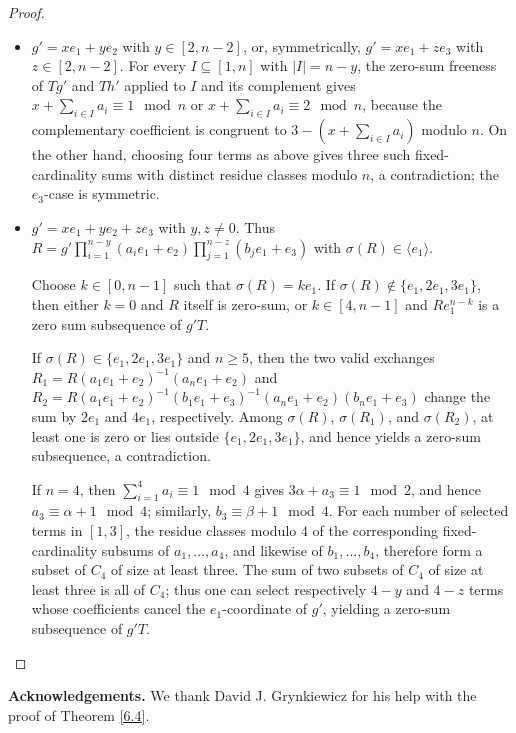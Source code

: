 \documentclass[a4paper, 10pt]{amsart}
\theoremstyle{plain}
\theoremstyle{definition}
\numberwithin{equation}{section}
\begin{document}
{\begin{proof}
\begin{itemize}
		\item[(iii)] $g'=xe_1+ye_2$ with $y\in[2,n-2]$, or, symmetrically, $g'=xe_1+ze_3$ with $z\in[2,n-2]$. 
		For every $I\subseteq[1,n]$ with $|I|=n-y$, the zero-sum freeness of $Tg'$ and $Th'$ applied to $I$ and its complement gives $x+\sum_{i\in I}a_i\equiv1\mod n$ or $x+\sum_{i\in I}a_i\equiv2\mod n$, because the complementary coefficient is congruent to $3-(x+\sum_{i\in I}a_i)$ modulo $n$. On the other hand, choosing four terms as above gives three such fixed-cardinality sums with distinct residue classes modulo $n$, a contradiction; the $e_3$-case is symmetric.
	
		\item[(iv)] $g'=xe_1+ye_2+ze_3$ with $y,z\ne 0$. Thus $R=g'\prod_{i=1}^{n-y} (a_ie_1+e_2)\prod_{j=1}^{n-z}(b_je_1+e_3)$ with $\sigma(R) \in \langle e_1 \rangle$. 
		
Choose $k\in[0,n-1]$ such that $\sigma(R)=ke_1$. If $\sigma(R)\notin \{e_1,2e_1,3e_1\}$, then either $k=0$ and $R$ itself is zero-sum, or $k\in[4,n-1]$ and $Re_1^{n-k}$ is a zero sum subsequence of $g'T$.
		
		If $\sigma(R)\in\{e_1,2e_1,3e_1\}$ and $n\ge5$, then the two valid exchanges $R_1=R(a_1e_1+e_2)^{-1}(a_ne_1+e_2)$ and $R_2=R(a_1e_1+e_2)^{-1}(b_1e_1+e_3)^{-1}(a_ne_1+e_2)(b_ne_1+e_3)$ change the sum by $2e_1$ and $4e_1$, respectively. Among $\sigma(R)$, $\sigma(R_1)$, and $\sigma(R_2)$, at least one is zero or lies outside $\{e_1,2e_1,3e_1\}$, and hence yields a zero-sum subsequence, a contradiction.
		
		If $n=4$, then $\sum_{i=1}^4a_i\equiv1\mod 4$ gives $3\alpha+a_3\equiv1 \mod 2$, and hence $a_3\equiv\alpha+1\mod 4$; similarly, $b_3\equiv\beta+1\mod 4$. For each number of selected terms in $[1,3]$, the residue classes modulo $4$ of the corresponding fixed-cardinality subsums of $a_1,\ldots,a_4$, and likewise of $b_1,\ldots,b_4$, therefore form a subset of $C_4$ of size at least three. The sum of two subsets of $C_4$ of size at least three is all of $C_4$; thus one can select respectively $4-y$ and $4-z$ terms whose coefficients cancel the $e_1$-coordinate of $g'$, yielding a zero-sum subsequence of $g'T$.
		\qedhere
	\end{itemize}
\end{proof}




\bigskip
\noindent
{\bf Acknowledgements.} We thank David J. Grynkiewicz for his help with the proof of Theorem \ref{6.4}. 

 




}
\end{document}
